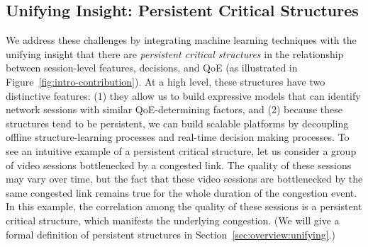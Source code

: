 \subsection{Unifying Insight: Persistent Critical Structures}
We address these challenges by integrating 
machine learning techniques with
the unifying insight that there are {\em persistent critical structures} in the relationship
between session-level features, decisions, and QoE 
(as illustrated in Figure~\ref{fig:intro-contribution}).
At a high level, these structures have two distinctive features:
(1) they allow us to build expressive models that can identify network 
sessions with similar QoE-determining factors, and 
(2) because these structures tend to be persistent, we can 
build scalable platforms by decoupling offline structure-learning 
processes and real-time decision making processes.
To see an intuitive example of a persistent critical structure, let us consider 
a group of video sessions bottlenecked by a congested link.
The quality of these sessions may vary over time, but the fact
that these video sessions are bottlenecked by the same congested link remains true 
for the whole duration of the congestion event.
In this example, the correlation among the quality of these sessions 
is a persistent critical structure, which manifests the underlying congestion.
(We will give a formal definition of persistent structures in
Section~\ref{sec:overview:unifying}.)





